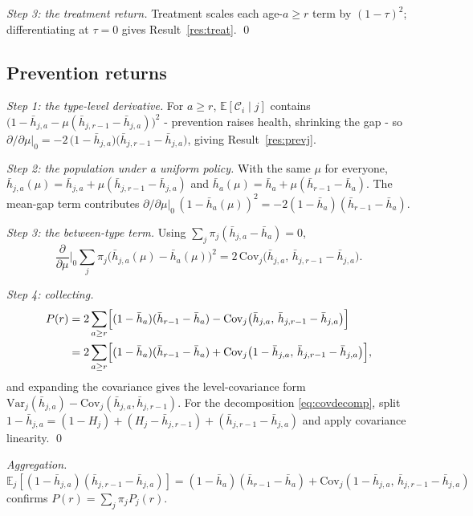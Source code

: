 \documentclass[11pt]{article}
\theoremstyle{remark}
\newcommand{\E}{\mathbb{E}}
\newcommand{\Var}{\mathrm{Var}}
\newcommand{\Cov}{\mathrm{Cov}}
\begin{document}
\emph{Step 3: the treatment return.} Treatment scales each age-$a\ge r$ term by $(1-\tau)^2$; differentiating at $\tau=0$ gives Result~\ref{res:treat}. \qed

\subsection*{Prevention returns}\label{app:prev}

\emph{Step 1: the type-level derivative.} For $a\ge r$, $\E[\mathcal{C}_i\mid j]$ contains $\bigl(1-\bar h_{j,a}-\mu(\bar h_{j,r-1}-\bar h_{j,a})\bigr)^2$ - prevention raises health, shrinking the gap - so $\partial/\partial\mu\big|_0=-2\,\bigl(1-\bar h_{j,a}\bigr)\bigl(\bar h_{j,r-1}-\bar h_{j,a}\bigr)$, giving Result~\ref{res:prevj}.

\emph{Step 2: the population under a uniform policy.} With the same $\mu$ for everyone, $\bar h_{j,a}(\mu)=\bar h_{j,a}+\mu(\bar h_{j,r-1}-\bar h_{j,a})$ and $\bar h_a(\mu)=\bar h_a+\mu(\bar h_{r-1}-\bar h_a)$.
The mean-gap term contributes $\partial/\partial\mu\big|_0\,(1-\bar h_a(\mu))^2=-2(1-\bar h_a)(\bar h_{r-1}-\bar h_a)$.

\emph{Step 3: the between-type term.} Using $\sum_j\pi_j(\bar h_{j,a}-\bar h_a)=0$,
\begin{equation}
\frac{\partial}{\partial\mu}\Big|_0\sum_j\pi_j\bigl(\bar h_{j,a}(\mu)-\bar h_a(\mu)\bigr)^2
=2\,\Cov_j\bigl(\bar h_{j,a},\,\bar h_{j,r-1}-\bar h_{j,a}\bigr).
\end{equation}

\emph{Step 4: collecting.}
\begin{align}
P(r)&=2\sum_{a\ge r}\Bigl[(1-\bar h_a)(\bar h_{r-1}-\bar h_a)-\Cov_j\bigl(\bar h_{j,a},\,\bar h_{j,r-1}-\bar h_{j,a}\bigr)\Bigr]\nonumber\\
&=2\sum_{a\ge r}\Bigl[(1-\bar h_a)(\bar h_{r-1}-\bar h_a)+\Cov_j\bigl(1-\bar h_{j,a},\,\bar h_{j,r-1}-\bar h_{j,a}\bigr)\Bigr],
\end{align}
and expanding the covariance gives the level-covariance form $\Var_j(\bar h_{j,a})-\Cov_j(\bar h_{j,a},\bar h_{j,r-1})$.
For the decomposition \eqref{eq:covdecomp}, split $1-\bar h_{j,a}=(1-H_j)+(H_j-\bar h_{j,r-1})+(\bar h_{j,r-1}-\bar h_{j,a})$ and apply covariance linearity.
\qed

\emph{Aggregation.} $\E_j[(1-\bar h_{j,a})(\bar h_{j,r-1}-\bar h_{j,a})] =(1-\bar h_a)(\bar h_{r-1}-\bar h_a)+\Cov_j(1-\bar h_{j,a},\,\bar h_{j,r-1}-\bar h_{j,a})$ confirms $P(r)=\sum_j\pi_jP_j(r)$.
\end{document}
